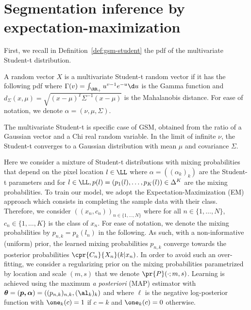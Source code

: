 \documentclass[a4paper,12pt]{article}
\begin{document}
\section{Segmentation inference by expectation-maximization}
\label{sec:algo-em}

First, we recall in Definition~\ref{def:gsm-student} the pdf of the multivariate Student-t distribution.
\begin{defn}
\label{def:gsm-student}
A random vector $X$ is a multivariate Student-t random vector if it has the following pdf
where $\Gamma(v) = \int_{\RR_+} u^{v-1} e^{-u} \d u$ is the Gamma function and $d_{\Sigma}(x,\mu)  = \sqrt{(x-\mu)^T \Sigma^{-1}(x-\mu)}$ is the Mahalanobis distance. For ease of notation, we denote $\alpha=(\nu,\mu,\Sigma)$.
\end{defn}
The multivariate Student-t is specific case of GSM, obtained from the ratio of a Gaussian vector and a Chi real random variable. In the limit of infinite $\nu$, the Student-t converges to a Gaussian distribution with mean $\mu$ and covariance $\Sigma$.  

Here we consider a mixture of Student-t distributions with mixing probabilities that depend on the pixel location $l \in \LL$
where $\alpha=((\alpha_k)_k)$ are the Student-t parameters and for $l \in \LL, p(l)=(p_1(l),\dots,p_K(l)) \in \Delta^K$ are the mixing probabilities. To train our model, we adopt the Expectation-Maximization (EM) approach which consists in completing the sample data with their class. Therefore, we consider $((x_n,c_n))_{n\in \{1,\dots, N\}}$ where for all $n \in \{1,\dots, N\}$, $c_n \in \{1,\dots,K\}$ is the class of $x_n$. For ease of notation, we denote the mixing probabilities by $p_{n,k}=p_k(l_n)$ in the following. As such, with a non-informative (uniform) prior, the learned mixing probabilities $p_{n,k}$ converge towards the posterior probabilities $\cpr{C_n}{X_n}(k|x_n)$. In order to avoid such an over-fitting, we consider a regularizing prior on the mixing probabilities parametrized by location and scale $(m,s)$ that we denote $\pr{P}(\cdot;m,s)$. Learning is achieved using the maximum \textit{a posteriori} (MAP) estimator
with $\boldsymbol{\theta}=(\boldsymbol{p,\alpha})=((p_{n,k})_{n,k},(\al_k)_k)$ and where $\ell$ is the negative log-posterior function 
with $\one_k(c)=1$ if $c=k$ and $\one_k(c)=0$ otherwise.
\end{document}

